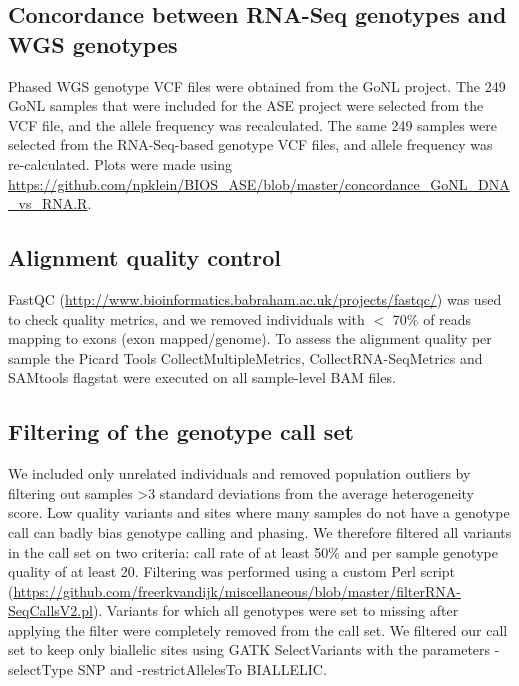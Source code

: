 \subsection{Concordance between RNA-Seq genotypes and WGS genotypes}
Phased WGS genotype VCF files were obtained from the GoNL project\cite{francioliWholegenomeSequenceVariation2014}. The 249 GoNL samples that were included for the ASE project were selected from the VCF file, and the allele frequency was recalculated. The same 249 samples were selected from the RNA-Seq-based genotype VCF files, and allele frequency was re-calculated. Plots were made using \url{https://github.com/npklein/BIOS\_ASE/blob/master/concordance\_GoNL\_DNA\_vs\_RNA.R}. 

\subsection{Alignment quality control}
FastQC (\url{http://www.bioinformatics.babraham.ac.uk/projects/fastqc/}) was used to check quality metrics, and we removed individuals with $<$ 70\% of reads mapping to exons (exon mapped/genome). To assess the alignment quality per sample the Picard Tools CollectMultipleMetrics, CollectRNA-SeqMetrics and SAMtools flagstat were executed on all sample-level BAM files.

\subsection{Filtering of the genotype call set}
We included only unrelated individuals and removed population outliers by filtering out samples >3 standard deviations from the average heterogeneity score. Low quality variants and sites where many samples do not have a genotype call can badly bias genotype calling and phasing. We therefore filtered all variants in the call set on two criteria: call rate of at least 50\% and per sample genotype quality of at least 20. Filtering was performed using a custom Perl script (\url{https://github.com/freerkvandijk/miscellaneous/blob/master/filterRNA-SeqCallsV2.pl}). Variants for which all genotypes were set to missing after applying the filter were completely removed from the call set. We filtered our call set to keep only biallelic sites using GATK SelectVariants with the parameters -selectType SNP and -restrictAllelesTo BIALLELIC.

